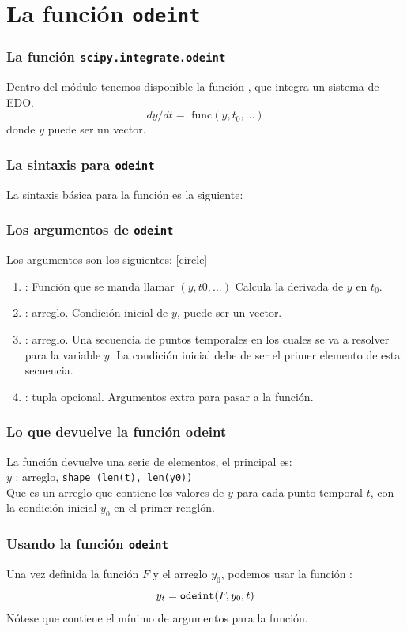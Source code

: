 \section{La función \texttt{odeint}}
\begin{frame}
\frametitle{La función \texttt{scipy.integrate.odeint}}
Dentro del módulo  tenemos disponible la función , que integra un sistema de EDO.
\[ dy / dt = \mbox{ func}(y, t_{0}, ...) \]
donde $y$ puede ser un vector.
\end{frame}
\begin{frame}[fragile]
\frametitle{La sintaxis para \texttt{odeint}}
La sintaxis básica para la función es la siguiente:
\\
\bigskip
{}
\end{frame}
\begin{frame}
\frametitle{Los argumentos de \texttt{odeint}}
Los argumentos son los siguientes:
[circle]
\begin{enumerate}[<+->]
\item {} : Función que se manda llamar $(y, t0, ...)$ Calcula la derivada de $y$ en $t_{0}$.
\item {} : arreglo. Condición inicial de $y$, puede ser un vector.
\item {} : arreglo. Una secuencia de puntos temporales en los cuales se va a resolver para la variable $y$. La condición inicial debe de ser el primer elemento de esta secuencia.
\item {} : tupla opcional. Argumentos extra para pasar a la función.
\end{enumerate}
\end{frame}
\begin{frame}
\frametitle{Lo que devuelve la función \textbf{odeint}}
La función  devuelve una serie de elementos, el principal es:
\\
\medskip
$y$ : arreglo, \texttt{shape (len(t), len(y0))}
\\
\medskip
Que es un arreglo que contiene los valores de $y$ para cada punto temporal $t$, con la condición inicial $y_{0}$ en el primer renglón.
\end{frame}
\begin{frame}
\frametitle{Usando la función \texttt{odeint}}
Una vez definida la función $F$ y el arreglo $y_{0}$, podemos usar la función :
\[ y_{t} = \mbox{\texttt{odeint}}(F, y_{0}, t)\]
Nótese que contiene el mínimo de argumentos para la función.
\end{frame}
